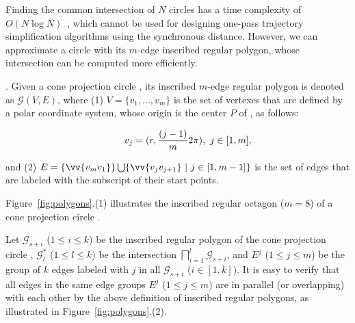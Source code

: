 Finding the common intersection of $N$ circles has a time complexity of ${O(N\log N)}$~\cite{Shamos:Circle}, which cannot be used
for designing one-pass trajectory simplification algorithms using the synchronous distance.
%
However, we can approximate a circle with its $m$-edge inscribed regular polygon, whose intersection can be computed more efficiently.




.
Given a cone projection circle , its inscribed $m$-edge regular polygon is denoted as $\mathcal{G}(V, E)$,
where (1) $V=\{v_1, \ldots, v_{m}\}$ is the set of vertexes that are defined by a polar coordinate system, whose origin is the center $P$ of \pcircle{}, as follows:


\vspace{-1ex}
\begin{equation*}
\label{equ-regular-polygon}
    \begin{aligned}
        \hspace{5ex}  v_j = (r, \frac{(j-1)}{m}2\pi), ~j \in [1, m], \\
    \end{aligned}
\end{equation*}
\vspace{-1ex}

\ni and (2) $E= \{\vv{v_mv_1}\} \bigcup \{\vv{v_jv_{j+1}}\ |\ j\in [1, m-1]\}$ is the set of edges that are labeled with the subscript of their start points.


Figure~\ref{fig:polygons}.(1) illustrates the inscribed regular octagon ($m=8$) of a cone projection circle .

Let $\mathcal{G}_{s+i}$ ($1\le i \le k$) be the inscribed regular polygon of the cone projection  circle ,
$\mathcal{G}^*_l$ ($1\le l\le k$) be the intersection $\bigsqcap_{i=1}^{l}\mathcal{G}_{s+i}$,
and $E^j$ ($1\le j \le m$) be the group of $k$ edges labeled with $j$ in all $\mathcal{G}_{s+i}$ ($i\in[1, k]$).
%
It is easy to verify that all edges in the same edge groups $E^j$ ($1\le j\le m$) are in parallel (or overlapping) with each other by the above definition of inscribed regular polygons, as illustrated in Figure~\ref{fig:polygons}.(2).






